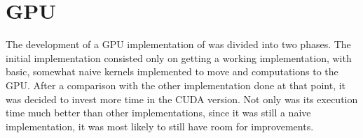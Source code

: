 \section{GPU}
\label{sec:cuda}

The development of a GPU implementation of \polu was divided into two phases. The initial implementation consisted only on getting a working implementation, with basic, somewhat naive kernels implemented to move \computeflux and \update computations to the GPU. After a comparison with the other implementation done at that point, it was decided to invest more time in the CUDA version. Not only was its execution time much better than other implementations, since it was still a naive implementation, it was most likely to still have room for improvements.





